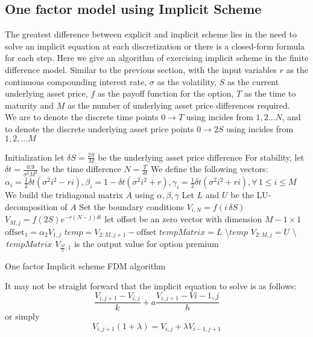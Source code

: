 \subsection{One factor model using Implicit Scheme}
The greatest difference between explicit and implicit scheme lies in the need to solve an implicit equation at each discretization or there is a closed-form formula for each step.
Here we give an algorithm of exercising implicit scheme in the finite difference model. Similar to the previous section, with the input variables $r$ as the continuous compounding interest rate, $\sigma$ as the volatility, $S$ as the current underlying asset price, $f$ as the payoff function for the option, $T$ as the time to maturity and $M$ as the number of underlying asset price differences required.\\
We are to denote the discrete time points $0 \to T$ using incides from $1,2 \dots N$, and to denote the discrete underlying asset price points $0 \to 2S$ using incides from $1,2, \dots M$\\[2mm]
\begin{algorithm}[H]
 Initialization\;
 let $\delta S = \frac{2S}{M}$ be the underlying asset price difference \;
 For stability, let $\delta t = \frac{0.9}{\sigma^{2}M^{2}}$ be the time difference\;
 $N = \frac{T}{\delta t}$\;
 We define the following vectors:\\
 $\alpha_{i} = \frac{1}{2}\delta t(\sigma^{2}i^{2} - ri), \beta_{i} = 1-\delta t(\sigma^{2}i^{2} + r), \gamma_{i} = \frac{1}{2}\delta t(\sigma^{2}i^{2} + ri), \forall \, 1 \le i \le M$\;
 We build the tridiagonal matrix $A$ using $\alpha, \beta, \gamma$\;
 Let $L$ and $U$ be the LU-decomposition of $A$\;
 Set the boundary conditions\;
  {
  $V_{i, N} = f(i\,\delta S)$\;
 }
  {
  $V_{M, j} = f(2S)e^{-r(N-j)\delta t}$\;
 }
 let offset be an zero vector with dimension $M-1 \times 1$\;
  {
  $\text{offset}_{1} = \alpha_{2} V_{1, j}$\;
  $temp =  V_{2:M, j+1} - \text{offset}$\;
  $tempMatrix =  L$ \textbackslash $temp$\;
  $V_{2:M, j} = U$ \textbackslash $\,tempMatrix$\;
 }
 $V_{\frac{M}{2},1}$ is the output value for option premium\;
\caption{One factor Implicit scheme FDM algorithm}
\end{algorithm}
It may not be straight forward that the implicit equation to solve is as follows:
$$\frac{V_{i, j+1} - V_{i,j}}{k} + a\frac{V_{i,j+1} - V{i-1,j}}{h}$$
or simply
$$V_{i,j+1}(1+\lambda) = V_{i,j} + \lambda V_{i-1, j+1}$$
\newpage
